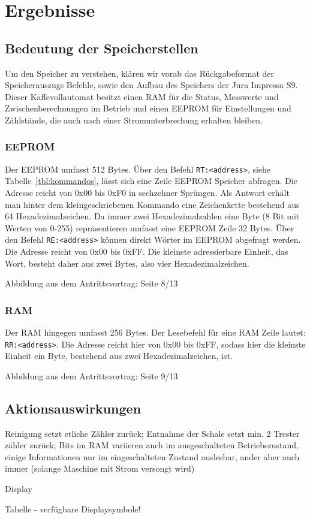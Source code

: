 \chapter{Ergebnisse}

\section{Bedeutung der Speicherstellen}




Um den Speicher zu verstehen, klären wir vorab das Rückgabeformat der Speicherauszugs Befehle, sowie den Aufbau des Speichers der Jura Impressa S9.
Dieser Kaffevollautomat besitzt einen \ac{RAM} für die Status, Messwerte und Zwischenberechnungen im Betrieb und einen \ac{EEPROM} für Einstellungen und Zählstände, die auch nach einer Stromunterbrechung erhalten bleiben.

\subsection{EEPROM}
Der \acf{EEPROM} umfasst 512 Bytes.
Über den Befehl \texttt{RT:<address>}, siehe Tabelle~\ref{tbl:kommandos}, lässt sich eine Zeile \ac{EEPROM} Speicher abfragen.
Die Adresse reicht von 0x00 bis 0xF0 in sechzehner Sprüngen.
Als Antwort erhält man hinter dem kleingeschriebenen Kommando eine Zeichenkette bestehend aus 64 Hexadezimalzeichen.
Da immer zwei Hexadezimalzahlen eine Byte (8 Bit mit Werten von 0-255) repräsentieren umfasst eine \ac{EEPROM} Zeile 32 Bytes.
Über den Befehl \texttt{RE:<address>} können direkt Wörter im \ac{EEPROM} abgefragt werden. Die Adresse reicht von 0x00 bis 0xFF.
Die kleinste adressierbare Einheit, das Wort, besteht daher aus zwei Bytes, also vier Hexadezimalzeichen.

\todo Abbildung aus dem Antrittsvortrag: Seite 8/13

\subsection{RAM}
Der \acf{RAM} hingegen umfasst 256 Bytes.
Der Lesebefehl für eine \ac{RAM} Zeile lautet: \texttt{RR:<address>}.
Die Adresse reicht hier von 0x00 bis 0xFF, sodass hier die kleinste Einheit ein Byte, bestehend aus zwei Hexadezimalzeichen, ist.

\todo Abbildung aus dem Antrittsvortrag: Seite 9/13


\section{Aktionsauswirkungen}
Reinigung setzt etliche Zähler zurück; Entnahme der Schale setzt min.
2 Trester zähler zurück; Bits im RAM variieren auch im ausgeschalteten Betriebszustand, einige Informationen nur im eingeschalteten Zustand auslesbar, ander aber auch immer (solange Maschine mit Strom versongt wird)







\todo
Display

Tabelle - verfügbare Displaysymbole!
\label{tbl:Displaysymbole}
